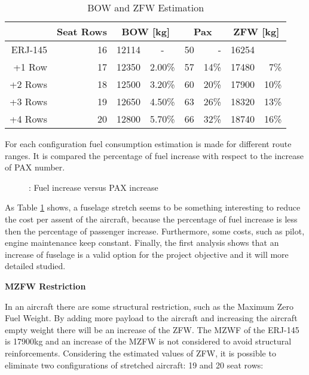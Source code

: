 \begin{table}[htbp]
  \centering
  \caption{BOW and ZFW Estimation}
    \begin{tabular}{rrccrrrr}
    \toprule
    \multicolumn{1}{c}{} & \multicolumn{1}{c}{Seat Rows} & \multicolumn{2}{c}{BOW [kg]} & \multicolumn{2}{c}{Pax} & \multicolumn{2}{c}{ZFW [kg]} \\
    \midrule
    ERJ-145 & 16    & 12114 & -     & 50    & -     & 16254 &  \\
    +1 Row & 17    & 12350 & 2.00\% & 57    & 14\%  & 17480 & 7\% \\
    +2 Rows & 18    & 12500 & 3.20\% & 60    & 20\%  & 17900 & 10\% \\
    +3 Rows & 19    & 12650 & 4.50\% & 63    & 26\%  & 18320 & 13\% \\
    +4 Rows & 20    & 12800 & 5.70\% & 66    & 32\%  & 18740 & 16\% \\
    \bottomrule
    \end{tabular}%
  \label{tab:BOWandZFW}%
\end{table}%


For each configuration fuel consumption estimation is made for different route ranges. It is compared the percentage of fuel increase with respect to the increase of PAX number.


\begin{figure}[H] %
\caption{: Fuel increase versus PAX increase}
\label{fig:FuelincreasePAXincrease}
\end{figure}

As Table \ref{tab:BOWandZFW} shows, a fuselage stretch seems to be something interesting to reduce the cost per assent of the aircraft, because the percentage of fuel increase is less then the percentage of passenger increase. Furthermore, some costs, such as pilot, engine maintenance keep constant.
Finally, the first analysis shows that an increase of fuselage is a valid option for the project objective and it will more detailed studied.


\textbf{MZFW Restriction}

In an aircraft there are some structural restriction, such as the Maximum Zero Fuel Weight. By adding more payload to the aircraft and increasing the aircraft empty weight there will be an increase of the ZFW. The MZWF of the ERJ-145 is 17900kg and an increase of the MZFW is not considered to avoid structural reinforcements. Considering the estimated values of ZFW, it is possible to eliminate two configurations of stretched aircraft: 19 and 20 seat rows:

